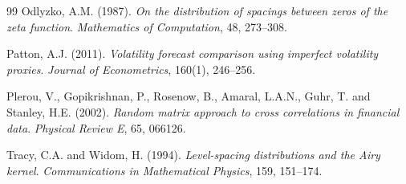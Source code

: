 \documentclass[11pt,a4paper]{article}
\begin{document}
\begin{thebibliography}{99}
Odlyzko, A.M. (1987). \emph{On the distribution of spacings between zeros of the zeta function}. \emph{Mathematics of Computation}, 48, 273--308.

Patton, A.J. (2011). \emph{Volatility forecast comparison using imperfect volatility proxies}. \emph{Journal of Econometrics}, 160(1), 246--256.

Plerou, V., Gopikrishnan, P., Rosenow, B., Amaral, L.A.N., Guhr, T. and Stanley, H.E. (2002). \emph{Random matrix approach to cross correlations in financial data}. \emph{Physical Review E}, 65, 066126.

Tracy, C.A. and Widom, H. (1994). \emph{Level-spacing distributions and the Airy kernel}. \emph{Communications in Mathematical Physics}, 159, 151--174.

\end{thebibliography}
\end{document}
